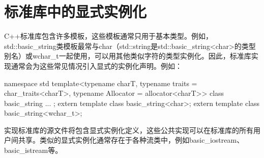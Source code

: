\section{标准库中的显式实例化}
C++标准库包含许多模板，这些模板通常只用于基本类型。例如，std::basic\_string类模板最常与char（std::string是std::basic\_string<char>的类型别名）或wchar\_t一起使用，可以用其他类似字符的类型实例化。因此，标准库实现通常会为这些常见情况引入显式的实例化声明。例如：

\begin{cpp}
namespace std {
	template<typename charT, typename traits = char_traits<charT>,
	typename Allocator = allocator<charT>>
	class basic_string {
		...
	};
	extern template class basic_string<char>;
	extern template class basic_string<wchar_t>;
}
\end{cpp}

实现标准库的源文件将包含显式实例化定义，这些公共实现可以在标准库的所有用户间共享。类似的显式实例化通常存在于各种流类中，例如basic\_iostream、basic\_istream等。